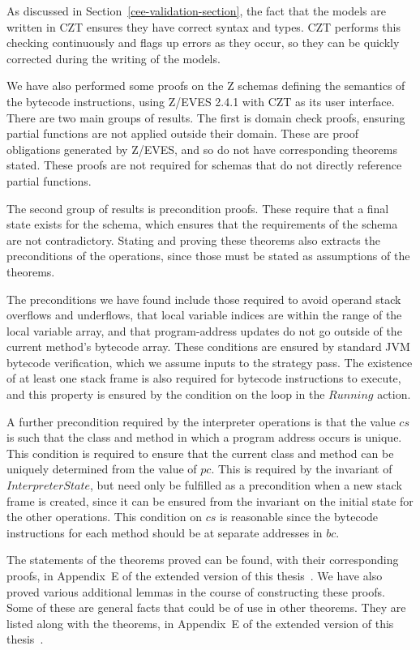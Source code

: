 As discussed in Section~\ref{cee-validation-section}, the fact that
the models are written in CZT ensures they have correct syntax and
types.
CZT performs this checking continuously and flags up errors as they
occur, so they can be quickly corrected during the writing of the
models.

We have also performed some proofs on the Z schemas defining the
semantics of the bytecode instructions, using Z/EVES 2.4.1 with CZT as
its user interface.
There are two main groups of results.
The first is domain check proofs, ensuring partial functions are
not applied outside their domain.
These are proof obligations generated by Z/EVES, and so do not have
corresponding theorems stated.
These proofs are not required for schemas that do not directly
reference partial functions.

The second group of results is precondition proofs.
These require that a final state exists for the schema, which ensures
that the requirements of the schema are not contradictory.
Stating and proving these theorems also extracts the preconditions of
the operations, since those must be stated as assumptions of the
theorems.

The preconditions we have found include those required to avoid
operand stack overflows and underflows, that local variable indices
are within the range of the local variable array, and that
program-address updates do not go outside of the current method's
bytecode array.
These conditions are ensured by standard JVM bytecode verification,
which we assume inputs to the strategy pass.
The existence of at least one stack frame is also required for
bytecode instructions to execute, and this property is ensured by the
condition on the loop in the $Running$ action.

A further precondition required by the interpreter operations is that
the value $cs$ is such that the class and method in which a program
address occurs is unique.
This condition is required to ensure that the current class and method
can be uniquely determined from the value of $pc$.
This is required by the invariant of $InterpreterState$, but need only
be fulfilled as a precondition when a new stack frame is created,
since it can be ensured from the invariant on the initial state for
the other operations.
This condition on $cs$ is reasonable since the bytecode instructions
for each method should be at separate addresses in $bc$.

The statements of the theorems proved can be found, with their
corresponding proofs, in Appendix~E of the extended version of this
thesis~\cite{baxter2018-extended}.
We have also proved various additional lemmas in the course of
constructing these proofs.
Some of these are general facts that could be of use in other
theorems.
They are listed along with the theorems, in Appendix~E of the extended
version of this thesis~\cite{baxter2018-extended}.

